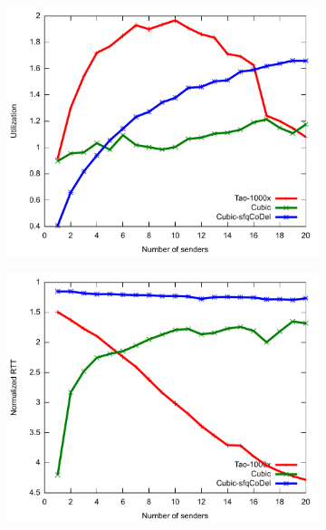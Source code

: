\begin{figure}
\centering
\begin{subfigure}[b]{0.33\textwidth}
\includegraphics[width=\textwidth]{figures/muxing-agility-tpt.pdf}
\end{subfigure}
\begin{subfigure}[b]{0.33\textwidth}
\includegraphics[width=\textwidth]{figures/muxing-agility-delay.pdf}
\end{subfigure}
\begin{subfigure}[b]{0.33\textwidth}

\end{subfigure}
\end{figure}
